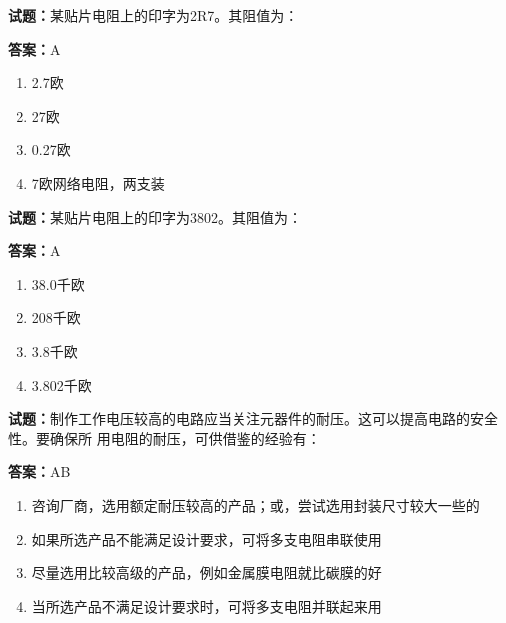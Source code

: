 \documentclass{ctexbook}
\begin{document}




\vspace{1em}

\textbf{试题：}某贴片电阻上的印字为2R7。其阻值为： 

\textbf{答案：}A 

\begin{enumerate}[leftmargin=3em]
  \item 2.7欧 

  \item 27欧 

  \item 0.27欧 

  \item 7欧网络电阻，两支装 

\end{enumerate}





\vspace{1em}

\textbf{试题：}某贴片电阻上的印字为3802。其阻值为： 

\textbf{答案：}A 

\begin{enumerate}[leftmargin=3em]
  \item 38.0千欧 

  \item 208千欧 

  \item 3.8千欧 

  \item 3.802千欧 

\end{enumerate}





\vspace{1em}

\textbf{试题：}制作工作电压较高的电路应当关注元器件的耐压。这可以提高电路的安全性。要确保所
用电阻的耐压，可供借鉴的经验有： 

\textbf{答案：}AB 

\begin{enumerate}[leftmargin=3em]
  \item 咨询厂商，选用额定耐压较高的产品；或，尝试选用封装尺寸较大一些的 

  \item 如果所选产品不能满足设计要求，可将多支电阻串联使用 

  \item 尽量选用比较高级的产品，例如金属膜电阻就比碳膜的好 

  \item 当所选产品不满足设计要求时，可将多支电阻并联起来用 

\end{enumerate}
\end{document}
